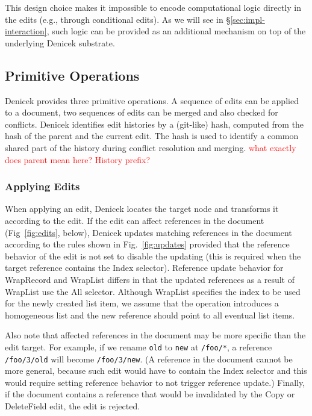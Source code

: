 \documentclass[sigconf,anonymous,screen]{acmart}
\newcommand{\ident}[1]{{\sffamily #1}}
\newcommand{\note}[1]{\textcolor{red}{#1}}
\begin{document}
This design choice makes it impossible to encode computational logic directly in the edits
(e.g., through conditional edits). As we will see in \S\ref{sec:impl-interaction}, such logic
can be provided as an additional mechanism on top of the underlying Denicek substrate.


\subsection{Primitive Operations}
\label{sec:system-ops}
Denicek provides three primitive operations. A sequence of edits can be applied to a document, two
sequences of edits can be merged and also checked for conflicts. Denicek identifies edit histories by
a (git-like) hash, computed from the hash of the parent and the current edit. The hash is used to
identify a common shared part of the history during conflict resolution and merging.
\note{what exactly does parent mean here? History prefix?}

\subsubsection*{Applying Edits}
When applying an edit, Denicek locates the target node and transforms it according to the edit. If
the edit can affect references in the document (Fig~\ref{fig:edits}, below), Denicek updates
matching references in the document according to the rules shown in Fig.~\ref{fig:updates} provided
that the reference behavior of the edit is not set to disable the updating (this is required when
the target reference contains the \ident{Index} selector). Reference update behavior for
\ident{WrapRecord} and \ident{WrapList} differs in that the updated references as a result of
\ident{WrapList} use the \ident{All} selector. Although \ident{WrapList} specifies the index to
be used for the newly created list item, we assume that the operation introduces a homogeneous
list and the new reference should point to all eventual list items.

Also note that affected references in the document may be more specific than the edit
target. For example, if we rename {\small\Verb|old|} to {\small\Verb|new|} at {\small\Verb|/foo/*|},
a reference {\small\Verb|/foo/3/old|} will become {\small\Verb|/foo/3/new|}. (A reference in the
document cannot be more general, because such edit would have to contain the \ident{Index} selector
and this would require setting reference behavior to not trigger reference update.) Finally,
if the document contains a reference that would be invalidated by the \ident{Copy} or
\ident{DeleteField} edit, the edit is rejected.
\end{document}
